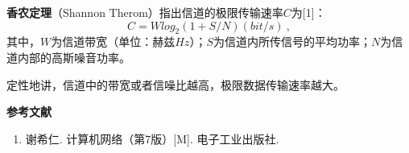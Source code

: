 

\textbf{香农定理}（Shannon Therom）指出信道的极限传输速率$C$为[1]：
\begin{equation}
C=Wlog_2(1+S/N)    (bit/s)~,
\end{equation}
其中，$W$为信道带宽（单位：赫兹$Hz$）；$S$为信道内所传信号的平均功率；$N$为信道内部的高斯噪音功率。

定性地讲，信道中的带宽或者信噪比越高，极限数据传输速率越大。


\textbf{参考文献}
\begin{enumerate}
\item 谢希仁. 计算机网络（第7版）[M]. 电子工业出版社.
\end{enumerate}